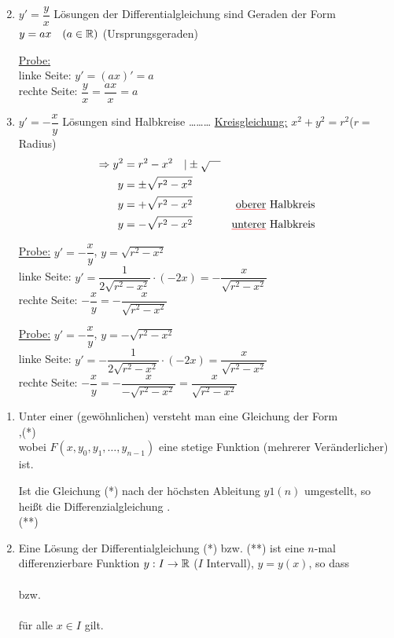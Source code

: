 \Bsp\quad
\begin{enumerate}
	\setcounter{enumi}{1}
	\item $y'=\dfrac{y}{x}$
	\imgplaceholder
	Lösungen der Differentialgleichung sind Geraden der Form $y=ax\quad(a\in\mathbb{R})$ (Ursprungsgeraden)
	
	\ul{Probe:}\\
	linke Seite: $y'=(ax)'=a$\\
	rechte Seite: $\dfrac{y}{x}=\dfrac{ax}{x}=a$
	
	\item $y'=-\dfrac{x}{y}$
	\imgplaceholder
	Lösungen sind Halbkreise
	\ldots\ldots\ldots\placeholder
	\ul{Kreisgleichung:} $x^2+y^2=r^2$\quad($r=$Radius)
	\begin{align*}
	\Rightarrow y^2&=r^2-x^2\quad|\pm\sqrt{\quad}\\
	y&=\pm\sqrt{r^2-x^2}\\
	y&=+\sqrt{r^2-x^2}&\text{\textcolor{red}{\underline{\textcolor{black}{oberer}}} Halbkreis}\\
	y&=-\sqrt{r^2-x^2}&\text{\textcolor{red}{\underline{\textcolor{black}{unterer}}} Halbkreis}
	\end{align*}
	
	\ul{Probe:} $y'=-\dfrac{x}{y}$, $y=\sqrt{r^2-x^2}$\\
	linke Seite: $y'=\dfrac{1}{2\sqrt{r^2-x^2}}\cdot(-2x)=-\dfrac{x}{\sqrt{r^2-x^2}}$\\
	rechte Seite: $-\dfrac{x}{y}=-\dfrac{x}{\sqrt{r^2-x^2}}$
	
	\ul{Probe:} $y'=-\dfrac{x}{y}$, $y=-\sqrt{r^2-x^2}$\\
	linke Seite: $y'=-\dfrac{1}{2\sqrt{r^2-x^2}}\cdot(-2x)=\dfrac{x}{\sqrt{r^2-x^2}}$\\
	rechte Seite: $-\dfrac{x}{y}=-\dfrac{x}{-\sqrt{r^2-x^2}}=\dfrac{x}{\sqrt{r^2-x^2}}$
\end{enumerate}

\Def\quad
\begin{enumerate}
	\item Unter einer  (gewöhnlichen)   versteht man eine Gleichung der Form\\
	\hhspace{2cm} ,\qquad(*)\\
	wobei $F(x,y_0,y_1,\ldots,y_{n-1})$ eine stetige Funktion (mehrerer Veränderlicher) ist.
	
	Ist die Gleichung (*)  nach der höchsten Ableitung $y1{(n)}$ umgestellt, so heißt die Differenzialgleichung .\\
	\hhspace{2cm}\qquad(**)
	
	\item Eine Lösung der Differentialgleichung (*) bzw. (**) ist eine $n$-mal differenzierbare Funktion $y:I\to\mathbb{R}$ ($I$ Intervall), $y=y(x)$, so dass\\
	\hhspace{2cm}\\
	bzw.\\
	\hhspace{2cm}\\
	für alle $x\in I$ gilt.
\end{enumerate}

